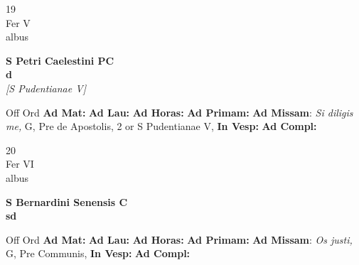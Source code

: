 \documentclass[10pt, openany]{book}
\begin{document}
    \begin{center}
        \begin{minipage}{3.5in}
            \vspace{2em}
            \begin{minipage}{0.5in}
                {\Huge 19} \\
                {\normalsize Fer V} \\
                {\normalsize albus}
            \end{minipage}
            \begin{minipage}{3.0in}
                \textbf{ \large S Petri Caelestini PC \\
                \textnormal{\normalsize d}} \\ \textit{[S Pudentianae V]} \\ 
            \end{minipage}
            \begin{justify}Off Ord
                \textbf{Ad Mat: }
                \textbf{Ad Lau: }
                \textbf{Ad Horas: }
                \textbf{Ad Primam: }\textbf{Ad Missam}: \textit{Si diligis me,} G, Pre de Apostolis, 2 or S Pudentianae V,  
                \textbf{In Vesp: }
                \textbf{Ad Compl: }
            \end{justify}
        \end{minipage}
    \end{center}

    \begin{center}
        \begin{minipage}{3.5in}
            \vspace{2em}
            \begin{minipage}{0.5in}
                {\Huge 20} \\
                {\normalsize Fer VI} \\
                {\normalsize albus}
            \end{minipage}
            \begin{minipage}{3.0in}
                \textbf{ \large S Bernardini Senensis C \\
                \textnormal{\normalsize sd}} \\ 
            \end{minipage}
            \begin{justify}Off Ord
                \textbf{Ad Mat: }
                \textbf{Ad Lau: }
                \textbf{Ad Horas: }
                \textbf{Ad Primam: }\textbf{Ad Missam}: \textit{Os justi,} G, Pre Communis,  
                \textbf{In Vesp: }
                \textbf{Ad Compl: }
            \end{justify}
        \end{minipage}
    \end{center}
\end{document}
